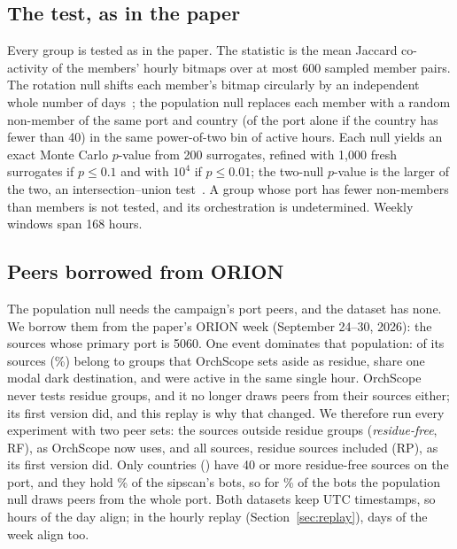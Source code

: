 \documentclass[11pt]{article}
\newcommand{\sysname}{OrchScope}
\begin{document}
\subsection{The test, as in the paper}
Every group is tested as in the paper. The statistic is the mean Jaccard co-activity of the
members' hourly bitmaps over at most 600 sampled member pairs. The rotation null shifts each
member's bitmap circularly by an independent whole number of days~\cite{lancaster2018surrogate};
the population null replaces each member with a random non-member of the same port and country
(of the port alone if the country has fewer than 40) in the same power-of-two bin of active
hours. Each null yields an exact Monte Carlo $p$-value from 200 surrogates, refined with 1,000
fresh surrogates if $p\le0.1$ and with $10^4$ if $p\le0.01$; the two-null $p$-value is the larger
of the two, an intersection--union test~\cite{berger1982iut}. A group whose port has fewer
non-members than members is not tested, and its orchestration is undetermined. Weekly windows
span 168 hours.

\subsection{Peers borrowed from ORION}
\label{sec:peers}
The population null needs the campaign's port peers, and the dataset has none. We borrow them
from the paper's ORION week (September 24--30, 2026): the \OrionFive{} sources whose primary port
is 5060. One event dominates that population: \OrionResidue{} of its sources (\OrionResiduePct\%)
belong to groups that \sysname{} sets aside as residue, \OrionTopDest{} share one modal dark
destination, and \OrionOneHour{} were active in the same single hour. \sysname{} never tests
residue groups, and it no longer draws peers from their sources either; its first version did,
and this replay is why that changed. We therefore run every experiment with two peer sets: the
\OrionScanners{} sources outside residue groups (\emph{residue-free}, RF), as \sysname{} now uses,
and all \OrionFive{} sources, residue sources included (RP), as its first version did. Only
\OrionScanCountries{} countries (\OrionScanCountryList) have 40 or more residue-free sources on the
port, and they hold \SipCountryCovPct\% of the sipscan's bots, so for \SipFallbackPct\% of the
bots the population null draws peers from the whole port. Both datasets keep UTC timestamps, so
hours of the day align; in the hourly replay (Section~\ref{sec:replay}), days of the week align
too.
\end{document}
